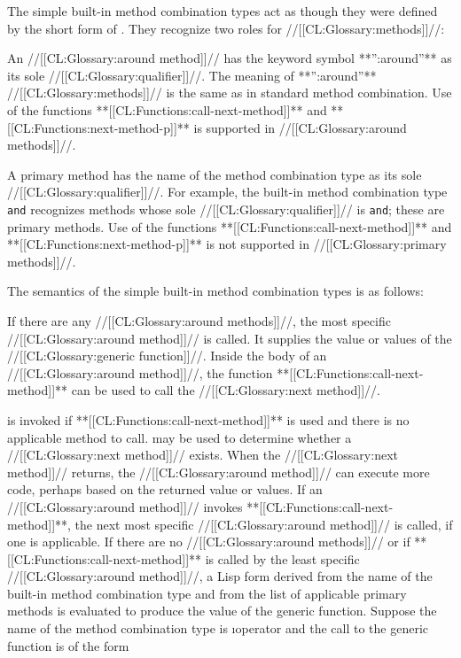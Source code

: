 The simple built-in method combination types act as though they were defined by the short form of .   They recognize two roles for //[[CL:Glossary:methods]]//:

\beginlist
                                                                   \itemitem{\bull} An //[[CL:Glossary:around method]]// has the keyword symbol  **'':around''** as its sole //[[CL:Glossary:qualifier]]//.  The meaning of  **'':around''** //[[CL:Glossary:methods]]// is the same as in standard method combination. Use of the functions **[[CL:Functions:call-next-method]]** and **[[CL:Functions:next-method-p]]** is supported in //[[CL:Glossary:around methods]]//.

\itemitem{\bull} A primary method has the name of the method combination type as its sole //[[CL:Glossary:qualifier]]//.  For example, the built-in method combination type {\tt and} recognizes methods whose sole //[[CL:Glossary:qualifier]]// is {\tt and}; these are primary methods. Use of the functions  **[[CL:Functions:call-next-method]]** and **[[CL:Functions:next-method-p]]** is not supported  in //[[CL:Glossary:primary methods]]//.

\endlist

The semantics of the simple built-in method combination types is as follows:

\beginlist \itemitem{\bull}                                                     If there are any //[[CL:Glossary:around methods]]//, the most specific //[[CL:Glossary:around method]]// is called.   It supplies the value or values of the //[[CL:Glossary:generic function]]//. 
                                     \itemitem{\bull} Inside the body of an //[[CL:Glossary:around method]]//, the function **[[CL:Functions:call-next-method]]** can be used to call the //[[CL:Glossary:next method]]//.

 is invoked if  **[[CL:Functions:call-next-method]]** is used and there is no applicable method to call.  may be used to determine whether a //[[CL:Glossary:next method]]// exists. When the //[[CL:Glossary:next method]]// returns,  the //[[CL:Glossary:around method]]// can execute more code, perhaps based on the returned value or values.
                     \itemitem{\bull} If an //[[CL:Glossary:around method]]// invokes **[[CL:Functions:call-next-method]]**, the next most specific //[[CL:Glossary:around method]]// is called, if one is applicable.  If there are no //[[CL:Glossary:around methods]]// or if **[[CL:Functions:call-next-method]]** is called by the least specific //[[CL:Glossary:around method]]//, a Lisp form derived from the name of the built-in method combination type and from the list of applicable primary methods is evaluated to produce the value of the generic function. Suppose the name of the method combination type is \i{operator} and the call to the generic function is of the form

